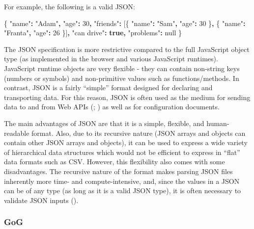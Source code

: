 \documentclass[
  openany]{book}
\newenvironment{Shaded}{\begin{snugshade}}{\end{snugshade}}
\newcommand{\DataTypeTok}[1]{\textcolor[rgb]{0.13,0.29,0.53}{#1}}
\newcommand{\DecValTok}[1]{\textcolor[rgb]{0.00,0.00,0.81}{#1}}
\newcommand{\KeywordTok}[1]{\textcolor[rgb]{0.13,0.29,0.53}{\textbf{#1}}}
\newcommand{\NormalTok}[1]{#1}
\newcommand{\OperatorTok}[1]{\textcolor[rgb]{0.81,0.36,0.00}{\textbf{#1}}}
\newcommand{\StringTok}[1]{\textcolor[rgb]{0.31,0.60,0.02}{#1}}
\theoremstyle{definition}
\theoremstyle{definition}
\theoremstyle{definition}
\theoremstyle{definition}
\theoremstyle{remark}
\begin{document}
For example, the following is a valid JSON:

\begin{Shaded}
\begin{Highlighting}[]
\NormalTok{\{}
  \StringTok{"name"}\OperatorTok{:} \StringTok{"Adam"}\OperatorTok{,}
  \StringTok{"age"}\OperatorTok{:} \DecValTok{30}\OperatorTok{,}
  \StringTok{"friends"}\OperatorTok{:}\NormalTok{ [\{ }\StringTok{"name"}\OperatorTok{:} \StringTok{"Sam"}\OperatorTok{,} \StringTok{"age"}\OperatorTok{:} \DecValTok{30}\NormalTok{ \}}\OperatorTok{,}\NormalTok{ \{ }\StringTok{"name"}\OperatorTok{:} \StringTok{"Franta"}\OperatorTok{,} \StringTok{"age"}\OperatorTok{:} \DecValTok{26}\NormalTok{ \}]}\OperatorTok{,}
  \StringTok{"can drive"}\OperatorTok{:} \KeywordTok{true}\OperatorTok{,}
  \StringTok{"problems"}\OperatorTok{:} \DataTypeTok{null}
\NormalTok{\}}
\end{Highlighting}
\end{Shaded}

The JSON specification is more restrictive compared to the full JavaScript object type (as implemented in the browser and various JavaScript runtimes). JavaScript runtime objects are very flexible - they can contain non-string keys (numbers or symbols) and non-primitive values such as functions/methods. In contrast, JSON is a fairly ``simple'' format designed for declaring and transporting data. For this reason, JSON is often used as the medium for sending data to and from Web APIs (; ) as well as for configuration documents.

The main advantages of JSON are that it is a simple, flexible, and human-readable format. Also, due to its recursive nature (JSON arrays and objects can contain other JSON arrays and objects), it can be used to express a wide variety of hierarchical data structures which would not be efficient to express in ``flat'' data formats such as CSV. However, this flexibility also comes with some disadvantages. The recursive nature of the format makes parsing JSON files inherently more time- and compute-intensive, and, since the values in a JSON can be of any type (as long as it is a valid JSON type), it is often necessary to validate JSON inputs ().

\subsubsection{GoG}\label{gog}
\end{document}
